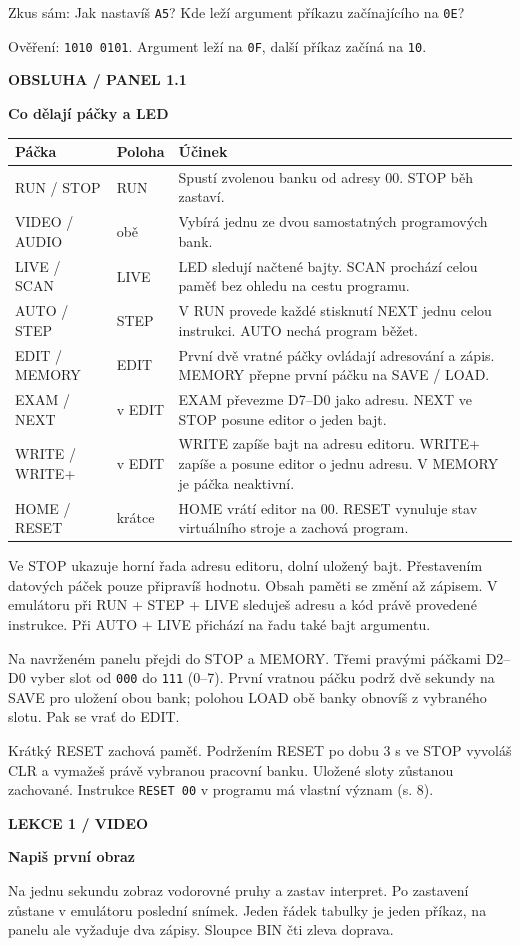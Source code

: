 \documentclass[11pt,a4paper]{article}
\newcommand{\tagline}[1]{{\sffamily\bfseries\color{accent}\small #1}\par}
\newcommand{\titleline}[1]{{\sffamily\bfseries\fontsize{25}{29}\selectfont #1\par}\vspace{2mm}}
\newcommand{\sub}[1]{\par\vspace{2mm}{\sffamily\bfseries\large #1\par}\nobreak}
\newcommand{\note}[1]{\par\vspace{2mm}\noindent\colorbox{pale}{\parbox{.96\linewidth}{\raggedright #1}}\par}
\begin{document}
\note{Zkus sám: Jak nastavíš \texttt{A5}? Kde leží argument příkazu začínajícího na \texttt{0E}?\par Ověření: \texttt{1010 0101}. Argument leží na \texttt{0F}, další příkaz začíná na \texttt{10}.}
\clearpage
\tagline{OBSLUHA  /  PANEL 1.1}
\titleline{Co dělají páčky a LED}
{\small\begin{tabularx}{\linewidth}{@{}llX@{}}\toprule
\textbf{Páčka} & \textbf{Poloha} & \textbf{Účinek}\\\midrule
RUN / STOP & RUN & Spustí zvolenou banku od adresy 00. STOP běh zastaví.\\
VIDEO / AUDIO & obě & Vybírá jednu ze dvou samostatných programových bank.\\
LIVE / SCAN & LIVE & LED sledují načtené bajty. SCAN prochází celou paměť bez ohledu na cestu programu.\\
AUTO / STEP & STEP & V RUN provede každé stisknutí NEXT jednu celou instrukci. AUTO nechá program běžet.\\
EDIT / MEMORY & EDIT & První dvě vratné páčky ovládají adresování a zápis. MEMORY přepne první páčku na SAVE / LOAD.\\
EXAM / NEXT & v EDIT & EXAM převezme D7--D0 jako adresu. NEXT ve STOP posune editor o jeden bajt.\\
WRITE / WRITE+ & v EDIT & WRITE zapíše bajt na adresu editoru. WRITE+ zapíše a posune editor o jednu adresu. V MEMORY je páčka neaktivní.\\
HOME / RESET & krátce & HOME vrátí editor na 00. RESET vynuluje stav virtuálního stroje a zachová program.\\
\bottomrule\end{tabularx}}\par
\sub{Jak číst obě řady světel}
Ve STOP ukazuje horní řada adresu editoru, dolní uložený bajt. Přestavením datových páček pouze připravíš hodnotu. Obsah paměti se změní až zápisem. V emulátoru při RUN + STEP + LIVE sleduješ adresu a kód právě provedené instrukce. Při AUTO + LIVE přichází na řadu také bajt argumentu.

\sub{Uložení obou bank do jednoho slotu}
Na navrženém panelu přejdi do STOP a MEMORY. Třemi pravými páčkami D2--D0 vyber slot od \texttt{000} do \texttt{111} (0--7). První vratnou páčku podrž dvě sekundy na SAVE pro uložení obou bank; polohou LOAD obě banky obnovíš z vybraného slotu. Pak se vrať do EDIT.

\note{Krátký RESET zachová paměť. Podržením RESET po dobu 3 s ve STOP vyvoláš CLR a vymažeš právě vybranou pracovní banku. Uložené sloty zůstanou zachované. Instrukce \texttt{RESET 00} v programu má vlastní význam (s. 8).}
\clearpage
\tagline{LEKCE 1  /  VIDEO}
\titleline{Napiš první obraz}
Na jednu sekundu zobraz vodorovné pruhy a zastav interpret. Po zastavení zůstane v emulátoru poslední snímek. Jeden řádek tabulky je jeden příkaz, na panelu ale vyžaduje dva zápisy. Sloupce BIN čti zleva doprava.
\end{document}

